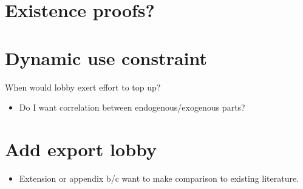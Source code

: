 \documentclass[12pt]{article}
\begin{document}
\section{Existence proofs?}


\section{Dynamic use constraint}
When would lobby exert effort to top up?
\begin{itemize}
	\item Do I want correlation between endogenous/exogenous parts? 
\end{itemize}


\section{Add export lobby}
		\begin{itemize}
			\item Extension or appendix b/c want to make comparison to existing literature.
		\end{itemize}
\end{document}

